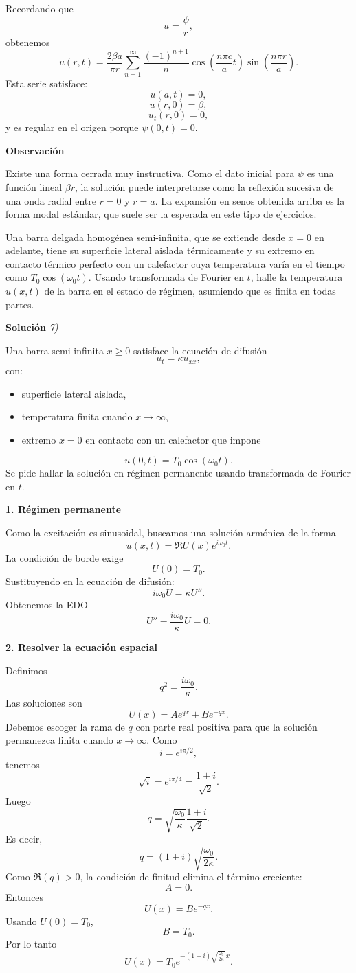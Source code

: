 \documentclass[11pt,spanish]{article}
\newcounter{problema}
\newcommand{\prob}{\stepcounter{problema} \vspace{.5cm} \noindent{\bf Problema \arabic{problema}: }}
\begin{document}
Recordando que
$$
u=\frac{\psi}{r},
$$
obtenemos
$$
\boxed{
u(r,t)
=
\frac{2\beta a}{\pi r}
\sum_{n=1}^{\infty}
\frac{(-1)^{n+1}}{n}
\cos\left(\frac{n\pi c}{a}t\right)
\sin\left(\frac{n\pi r}{a}\right).
}
$$
Esta serie satisface:
$$
u(a,t)=0,
$$
$$
u(r,0)=\beta,
$$
$$
u_t(r,0)=0,
$$
y es regular en el origen porque $\psi(0,t)=0$.

{\bf Observación}

Existe una forma cerrada muy instructiva. 
Como el dato inicial para $\psi$ es una función lineal $\beta r$, la solución puede interpretarse como la reflexión sucesiva de una onda radial entre $r=0$ y $r=a$. 
La expansión en senos obtenida arriba es la forma modal estándar, que suele ser la esperada en este tipo de ejercicios.


\prob Una barra delgada homogénea semi-infinita, que se extiende desde \(x=0\) en adelante, tiene su superficie lateral aislada térmicamente y su extremo en contacto térmico perfecto con un calefactor cuya temperatura varía en el tiempo como \(T_0\cos(\omega_0 t)\). Usando transformada de Fourier en \(t\), halle la temperatura \(u(x,t)\) de la barra en el estado de régimen, asumiendo que es finita en todas partes.

\vspace{0.5cm}
{\bf Soluci\'on }{\em 7)}
\vspace{0.5cm}

Una barra semi-infinita $x\ge 0$ satisface la ecuación de difusión
$$
u_t=\kappa u_{xx},
$$
con:
\begin{itemize}
\item superficie lateral aislada,
\item temperatura finita cuando $x\to\infty$,
\item extremo $x=0$ en contacto con un calefactor que impone
\end{itemize}
$$
u(0,t)=T_0\cos(\omega_0 t).
$$
Se pide hallar la solución en régimen permanente usando transformada de Fourier en $t$. 

{\bf 1. Régimen permanente}

Como la excitación es sinusoidal, buscamos una solución armónica de la forma
$$
u(x,t)=\Re{U(x)e^{i\omega_0 t}}.
$$
La condición de borde exige
$$
U(0)=T_0.
$$
Sustituyendo en la ecuación de difusión:
$$
i\omega_0 U
=
\kappa U''.
$$
Obtenemos la EDO
$$
U''-\frac{i\omega_0}{\kappa}U=0.
$$

{\bf 2. Resolver la ecuación espacial}

Definimos
$$
q^2=\frac{i\omega_0}{\kappa}.
$$
Las soluciones son
$$
U(x)=Ae^{qx}+Be^{-qx}.
$$
Debemos escoger la rama de $q$ con parte real positiva para que la solución permanezca finita cuando $x\to\infty$.
Como
$$
i=e^{i\pi/2},
$$
tenemos
$$
\sqrt{i}
=
e^{i\pi/4}
=
\frac{1+i}{\sqrt2}.
$$
Luego
$$
q
=
\sqrt{\frac{\omega_0}{\kappa}}
\frac{1+i}{\sqrt2}.
$$
Es decir,
$$
q
=
(1+i)
\sqrt{\frac{\omega_0}{2\kappa}}.
$$
Como $\Re(q)>0$, la condición de finitud elimina el término creciente:
$$
A=0.
$$
Entonces
$$
U(x)
=
B e^{-qx}.
$$
Usando $U(0)=T_0$,
$$
B=T_0.
$$
Por lo tanto
$$
U(x)
=
T_0
e^{-(1+i)\sqrt{\frac{\omega_0}{2\kappa}}\,x}.
$$
\end{document}
